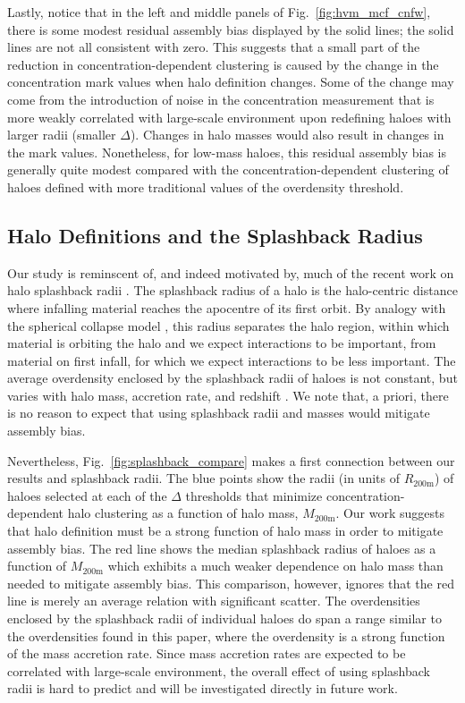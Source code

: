 \documentclass[usenatbib,fleqn]{mnras}
\begin{document}
Lastly, notice that in the left and middle panels of Fig.~\ref{fig:hvm_mcf_cnfw}, there is some modest residual assembly bias displayed by the solid lines; the solid lines are not all consistent with zero. This suggests that a small part of the reduction in concentration-dependent clustering is caused by the change in the concentration mark values when halo definition changes. Some of the change may come from the introduction of noise in the concentration measurement that is more weakly correlated with large-scale environment upon redefining haloes with larger radii (smaller $\Delta$). Changes in halo masses would also result in changes in the mark values. Nonetheless, for low-mass haloes, this residual assembly bias is generally quite modest compared with the concentration-dependent clustering of haloes defined with more traditional values of the overdensity threshold.

\subsection{Halo Definitions and the Splashback Radius}
\label{subsection:splashback}

Our study is reminscent of, and indeed motivated by, much of the recent work on halo splashback radii \citep{more_etal15, mansfield_etal16, diemer_etal17}. The splashback radius of a halo is the halo-centric distance where infalling material reaches the apocentre of its first orbit. By analogy with the spherical collapse model \citep[e.g.,][]{fillmore_goldreich84}, this radius separates the halo region, within which material is orbiting the halo and we expect interactions to be important, from material on first infall, for which we expect interactions to be less important. The average overdensity enclosed by the splashback radii of haloes is not constant, but varies with halo mass, accretion rate, and redshift \citep{mansfield_etal16, diemer_etal17}. We note that, a priori, there is no reason to expect that using splashback radii and masses would mitigate assembly bias. 

Nevertheless, Fig.~\ref{fig:splashback_compare} makes a first connection between our results and splashback radii. The blue points show the radii (in units of $R_{200\text{m}}$) of haloes selected at each of the $\Delta$ thresholds that minimize concentration-dependent halo clustering as a function of halo mass, $M_{200\text{m}}$. Our work suggests that halo definition must be a strong function of halo mass in order to mitigate assembly bias. The red line shows the median splashback radius of haloes as a function of $M_{200\text{m}}$ \citep{diemer_etal17} which exhibits a much weaker dependence on halo mass than needed to mitigate assembly bias. This comparison, however, ignores that the red line is merely an average relation with significant scatter. The overdensities enclosed by the splashback radii of individual haloes do span a range similar to the overdensities found in this paper, where the overdensity is a strong function of the mass accretion rate. Since mass accretion rates are expected to be correlated with large-scale environment, the overall effect of using splashback radii is hard to predict and will be investigated directly in future work.
\end{document}
